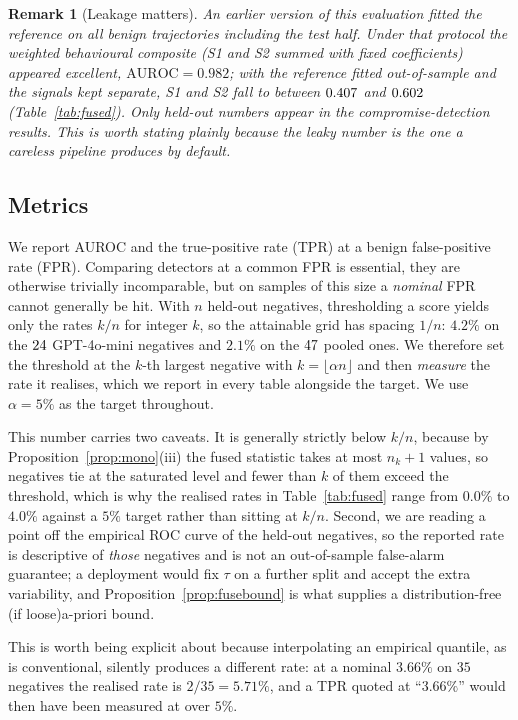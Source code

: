 \documentclass[pdflatex,sn-basic]{sn-jnl}%
\theoremstyle{thmstyleone}
\theoremstyle{thmstyletwo}
\newtheorem{remark}{Remark}
\theoremstyle{thmstylethree}
\begin{document}
\begin{remark}[Leakage matters]
An earlier version of this evaluation fitted the reference on all benign
trajectories including the test half. Under that protocol the weighted behavioural
composite (S1 and S2 summed with fixed coefficients) appeared excellent,
$\mathrm{AUROC} = 0.982$; with the reference fitted out-of-sample and the signals
kept separate, S1 and S2 fall to between $0.407$ and $0.602$
(Table~\ref{tab:fused}). Only held-out numbers appear in the compromise-detection
results.
This is worth stating plainly because the leaky number is the one a careless
pipeline produces by default.
\end{remark}

\subsection{Metrics}\label{sec:metrics}

We report AUROC and the true-positive rate (TPR) at a benign false-positive rate
(FPR). Comparing detectors at a common FPR is essential, they are otherwise
trivially incomparable, but on samples of this size a \emph{nominal} FPR cannot
generally be hit. With $n$ held-out negatives, thresholding a score yields only
the rates $k/n$ for integer $k$, so the attainable grid has spacing $1/n$: $4.2\%$
on the $24$ GPT-4o-mini negatives and $2.1\%$ on the $47$ pooled ones. We
therefore set the threshold at the $k$-th largest negative with
$k = \lfloor \alpha n \rfloor$ and then \emph{measure} the rate it realises, which
we report in every table alongside the target. We use $\alpha = 5\%$ as the target
throughout.

This number carries two caveats. It is generally strictly below $k/n$, because
by Proposition~\ref{prop:mono}(iii) the fused statistic takes at most $n_k+1$
values, so negatives tie at the saturated level and fewer than $k$ of them exceed
the threshold, which is why the realised rates in Table~\ref{tab:fused} range from
$0.0\%$ to $4.0\%$ against a $5\%$ target rather than sitting at $k/n$. Second, we
are reading a point off the empirical ROC curve of the held-out negatives, so the
reported rate is descriptive of \emph{those} negatives and is not an out-of-sample
false-alarm guarantee; a deployment would fix $\tau$ on a further split and accept
the extra variability, and Proposition~\ref{prop:fusebound} is what supplies a
distribution-free (if loose)a-priori bound.

This is worth being explicit about because interpolating an empirical quantile, as
is conventional, silently produces a different rate: at a nominal $3.66\%$ on $35$
negatives the realised rate is $2/35 = 5.71\%$, and a TPR quoted at ``$3.66\%$''
would then have been measured at over $5\%$.
\end{document}
